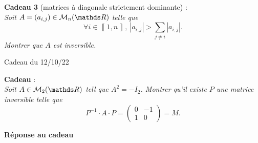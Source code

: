 \documentclass[a4paper]{article}
\begin{document}
	\bigskip
	\bigskip
	{\bf Cadeau 3} (matrices à diagonale strictement dominante) :\\
	\slshape
	Soit $A = (a_{i,j}) \in \mathscr{M}_{n}(\R)$\/ telle que \[
		\forall  i \in \left\llbracket 1,n \right\rrbracket,\:|a_{i,j}| > \sum_{j \neq i} |a_{i,j}|
	.\] Montrer que $A$\/ est inversible.
	\upshape
	\clearpage
	\centerline{\LARGE Cadeau du 12/10/22}
	\bigskip
	\bigskip
	{\bf Cadeau} :\\
	\slshape
	Soit $A \in \mathscr{M}_2(\R)$ tell que $A^2 = -I_2$. Montrer qu'il existe $P$\/ une matrice inversible telle que \[
		P^{-1}\cdot A\cdot P = \begin{pmatrix}
			0&-1\\
			1&0
		\end{pmatrix} = M
	.\]
	\upshape
	\bigskip
	\bigskip

	{\bf Réponse au cadeau}\/\\
	\begin{comment}
		Le polynôme $Q(X) = X^2 + 1 = (X-i)(X+i)$\/ est annulateur de la matrice~$A$. D'où~$\Sp_\C (A) \subset \{-i,i\}$. Le polynôme~$Q$\/ est scindé à racines simples dans~$\C[X]$, d'où la matrice est diagonalisable dans~$\mathscr{M}_2(\C)$. Or, le spectre est stable par conjugaison car~$A \in \mathscr{M}_2(\R)$, d'où~$\Sp_\C(A) = \{-i,i\}$. De même, on remarque~$M^2 = I_2$, et donc tout ce qui est dit précédemment est aussi vrai pour cette matrice.
		Ainsi, il existe une matrice inversible $P \in \mathrm{GL}_2(\C)$\/ telle que \[
			P^{-1}\cdot A\cdot P = \begin{pmatrix}
				i&0\\
				0&-i
			\end{pmatrix}\qquad\text{et}\qquad \begin{pmatrix}
				0&-1\\
				1&0
			\end{pmatrix} \sim \begin{pmatrix}
				i&0\\
				0&-i
			\end{pmatrix}
		.\]
		D'où $A$\/ et ${0\hfill\:-1\choose1\hfill\:0}$\/ sont semblables dans $\mathscr{M}_2(\C)$.
	\end{comment}
\end{document}
